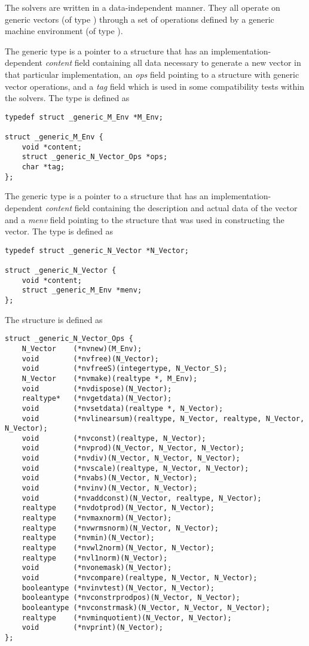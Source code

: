 %
The {\sundials} solvers are written in a data-independent manner. 
They all operate on generic vectors (of type ) through a set of
operations defined by a generic machine environment (of type ). 

The generic  type is a pointer to a structure that has an
implementation-dependent {\em content} field containing
all data necessary to generate a new vector in that particular
implementation, an {\em ops} field pointing to a structure with
generic vector operations, and a {\em tag} field which is used
in some compatibility tests within the {\sundials} solvers. 
The type  is defined as
\begin{verbatim}
typedef struct _generic_M_Env *M_Env;

struct _generic_M_Env {
    void *content;
    struct _generic_N_Vector_Ops *ops;
    char *tag;
};
\end{verbatim}

The generic  type is a pointer to a structure that has an 
implementation-dependent {\em content} field containing the 
description and actual data of the vector and a {\em menv} field 
pointing to the  structure that was used in constructing the
vector.
The type  is defined as
\begin{verbatim}
typedef struct _generic_N_Vector *N_Vector;

struct _generic_N_Vector {
    void *content;
    struct _generic_M_Env *menv;
};
\end{verbatim}

The  structure is defined as
\begin{verbatim}
struct _generic_N_Vector_Ops {
    N_Vector    (*nvnew)(M_Env);
    void        (*nvfree)(N_Vector);
    void        (*nvfreeS)(integertype, N_Vector_S);
    N_Vector    (*nvmake)(realtype *, M_Env);
    void        (*nvdispose)(N_Vector);
    realtype*   (*nvgetdata)(N_Vector);
    void        (*nvsetdata)(realtype *, N_Vector);
    void        (*nvlinearsum)(realtype, N_Vector, realtype, N_Vector, N_Vector); 
    void        (*nvconst)(realtype, N_Vector);
    void        (*nvprod)(N_Vector, N_Vector, N_Vector);
    void        (*nvdiv)(N_Vector, N_Vector, N_Vector);
    void        (*nvscale)(realtype, N_Vector, N_Vector);
    void        (*nvabs)(N_Vector, N_Vector);
    void        (*nvinv)(N_Vector, N_Vector);
    void        (*nvaddconst)(N_Vector, realtype, N_Vector);
    realtype    (*nvdotprod)(N_Vector, N_Vector);
    realtype    (*nvmaxnorm)(N_Vector);
    realtype    (*nvwrmsnorm)(N_Vector, N_Vector);
    realtype    (*nvmin)(N_Vector);
    realtype    (*nvwl2norm)(N_Vector, N_Vector);
    realtype    (*nvl1norm)(N_Vector);
    void        (*nvonemask)(N_Vector);
    void        (*nvcompare)(realtype, N_Vector, N_Vector);
    booleantype (*nvinvtest)(N_Vector, N_Vector);
    booleantype (*nvconstrprodpos)(N_Vector, N_Vector);
    booleantype (*nvconstrmask)(N_Vector, N_Vector, N_Vector);
    realtype    (*nvminquotient)(N_Vector, N_Vector);
    void        (*nvprint)(N_Vector);
};
\end{verbatim}

